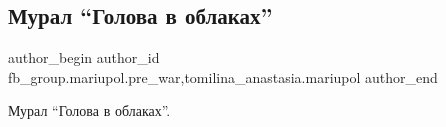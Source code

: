  
 
 
 
 

\subsection{Мурал \enquote{Голова в облаках}}
\label{sec:15_02_2023.fb.fb_group.mariupol.pre_war.1.mural__golova_v_obla}
 
\ifcmt
 author_begin
   author_id fb_group.mariupol.pre_war,tomilina_anastasia.mariupol
 author_end
\fi

Мурал \enquote{Голова в облаках}.

